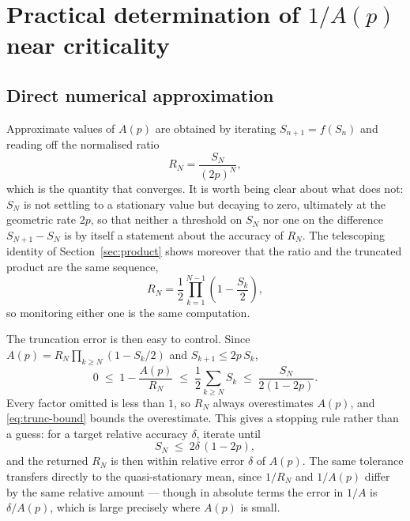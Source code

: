 \documentclass[11pt]{article}
\begin{document}
\section{Practical determination of \texorpdfstring{$1/A(p)$}{1/A(p)} near criticality}

\subsection{Direct numerical approximation}

Approximate values of $A(p)$ are obtained by iterating $S_{n+1}=f(S_n)$ and reading
off the normalised ratio
\begin{equation}
R_N=\frac{S_N}{(2p)^N},
\label{eq:ratiomonitor}
\end{equation}
which is the quantity that converges. It is worth being clear about what does not:
$S_N$ is not settling to a stationary value but decaying to zero, ultimately at the
geometric rate $2p$, so that neither a threshold on $S_N$ nor one on the difference
$S_{N+1}-S_N$ is by itself a statement about the accuracy of $R_N$. The telescoping identity of
Section~\ref{sec:product} shows moreover that the ratio and the truncated product
are the same sequence,
\[
R_N=\frac{1}{2}\prod_{k=1}^{N-1}\left(1-\frac{S_k}{2}\right),
\]
so monitoring either one is the same computation.

The truncation error is then easy to control. Since $A(p)=R_N\prod_{k\ge N}(1-S_k/2)$
and $S_{k+1}\le 2p\,S_k$,
\begin{equation}
0\;\le\;1-\frac{A(p)}{R_N}\;\le\;\frac{1}{2}\sum_{k\ge N}S_k\;\le\;\frac{S_N}{2(1-2p)} .
\label{eq:trunc-bound}
\end{equation}
Every factor omitted is less than $1$, so $R_N$ always overestimates $A(p)$, and
\eqref{eq:trunc-bound} bounds the overestimate. This gives a stopping rule rather
than a guess: for a target relative accuracy $\delta$, iterate until
\begin{equation}
S_N\;\le\;2\delta\,(1-2p),
\label{eq:stoprule}
\end{equation}
and the returned $R_N$ is then within relative error $\delta$ of $A(p)$. The same
tolerance transfers directly to the quasi-stationary mean, since $1/R_N$ and
$1/A(p)$ differ by the same relative amount --- though in absolute terms the error
in $1/A$ is $\delta/A(p)$, which is large precisely where $A(p)$ is small.
\end{document}
